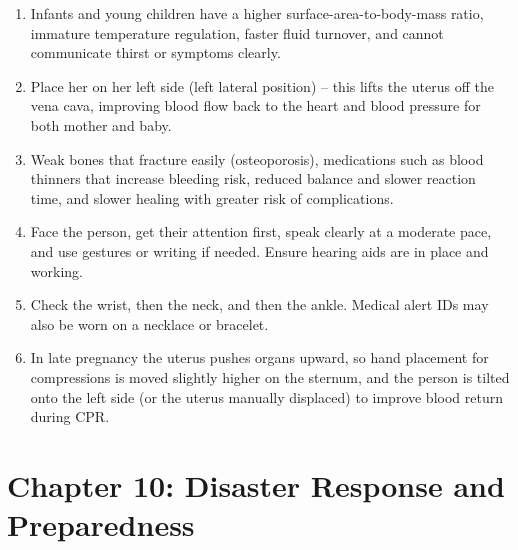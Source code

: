 \begin{enumerate}[leftmargin=*]
\item Infants and young children have a higher surface-area-to-body-mass ratio, immature temperature regulation, faster fluid turnover, and cannot communicate thirst or symptoms clearly.
\item Place her on her left side (left lateral position) -- this lifts the uterus off the vena cava, improving blood flow back to the heart and blood pressure for both mother and baby.
\item Weak bones that fracture easily (osteoporosis), medications such as blood thinners that increase bleeding risk, reduced balance and slower reaction time, and slower healing with greater risk of complications.
\item Face the person, get their attention first, speak clearly at a moderate pace, and use gestures or writing if needed. Ensure hearing aids are in place and working.
\item Check the wrist, then the neck, and then the ankle. Medical alert IDs may also be worn on a necklace or bracelet.
\item In late pregnancy the uterus pushes organs upward, so hand placement for compressions is moved slightly higher on the sternum, and the person is tilted onto the left side (or the uterus manually displaced) to improve blood return during CPR.
\end{enumerate}

\section*{Chapter 10: Disaster Response and Preparedness}

